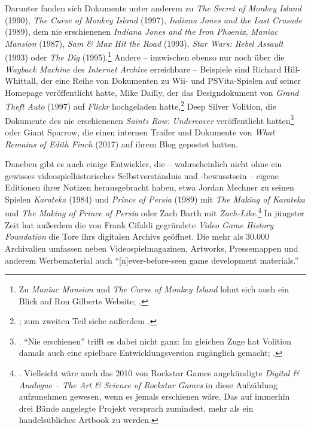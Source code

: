 \documentclass[a5paper,pagesize,numbers=noenddot]{scrbook}
\begin{document}
Darunter fanden sich Dokumente unter anderem zu \textit{The Secret of Monkey Island} (1990), \textit{The Curse of Monkey Island} (1997), \textit{Indiana Jones and the Last Crusade} (1989), dem nie erschienenen \textit{Indiana Jones and the Iron Phoenix}, \textit{Maniac Mansion} (1987), \textit{Sam \& Max Hit the Road} (1993), \textit{Star Wars: Rebel Assault} (1993) oder \textit{The Dig} (1995).\footnote{Zu \textit{Maniac Mansion} und \textit{The Curse of Monkey Island} lohnt sich auch ein Blick auf Ron Gilberts Website; \autocite[vgl. etwa][]{gilbert_maniac_mansion_2014}.}
Andere -- inzwischen ebenso nur noch über die \textit{Wayback Machine} des \textit{Internet Archive} erreichbare -- Beispiele sind Richard Hill-Whittall, der eine Reihe von Dokumenten zu Wii- und PSVita-Spielen auf seiner Homepage veröffentlicht hatte,\autocite[Vgl.][]{hill_whittall_gdd_2017} Mike Dailly, der das Designdokument von \textit{Grand Theft Auto} (1997) auf \textit{Flickr} hochgeladen hatte,\footnote{\autocite[Vgl.][]{dailly_race_n_chase_2011}; zum zweiten Teil siehe außerdem \autocite{internet_archive_gta_2}.} Deep Silver Volition, die Dokumente des nie erschienenen \textit{Saints Row: Undercover} veröffentlicht hatten\footnote{\autocite[Vgl.][]{volition_thursday_2016}. \enquote{Nie erschienen} trifft es dabei nicht ganz: Im gleichen Zuge hat Volition damals auch eine spielbare Entwicklungsversion zugänglich gemacht; \autocite[vgl.][]{frank_canceled_2016}.} oder Giant Sparrow, die einen internen Trailer und Dokumente von \textit{What Remains of Edith Finch} (2017) auf ihrem Blog gepostet hatten.\autocite[Vgl.][]{giant_sparrow_edith_2018}

Daneben gibt es auch einige Entwickler, die -- wahrscheinlich nicht ohne ein gewisses videospielhistorisches Selbstverständnis und -bewusstsein -- eigene Editionen ihrer Notizen herausgebracht haben, etwa Jordan Mechner zu seinen Spielen \textit{Karateka} (1984) und \textit{Prince of Persia} (1989) mit \textit{The Making of Karateka} und \textit{The Making of Prince of Persia} oder Zach Barth mit \textit{Zach-Like}.\footnote{\autocite[Vgl.][]{mechner_karateka_2012,mechner_prince_2020,barth_zach_like_2019}.
Vielleicht wäre auch das 2010 von Rockstar Games angekündigte \textit{Digital \& Analogue -- The Art \& Science of Rockstar Games} in diese Aufzählung aufzunehmen gewesen, wenn es jemals erschienen wäre.
Das auf immerhin drei Bände angelegte Projekt versprach zumindest, mehr als ein handelsübliches Artbook zu werden.}
In jüngster Zeit hat außerdem die von Frank Cifaldi gegründete \textit{Video Game History Foundation} die Tore ihrs digitalen Archivs geöffnet.
Die mehr als 30.000 Archivalien umfassen neben Videospielmagazinen, Artworks, Pressemappen und anderem Werbematerial auch \enquote{[n]ever-before-seen game development materials.}\autocite{salvador_library_2025}
\end{document}
